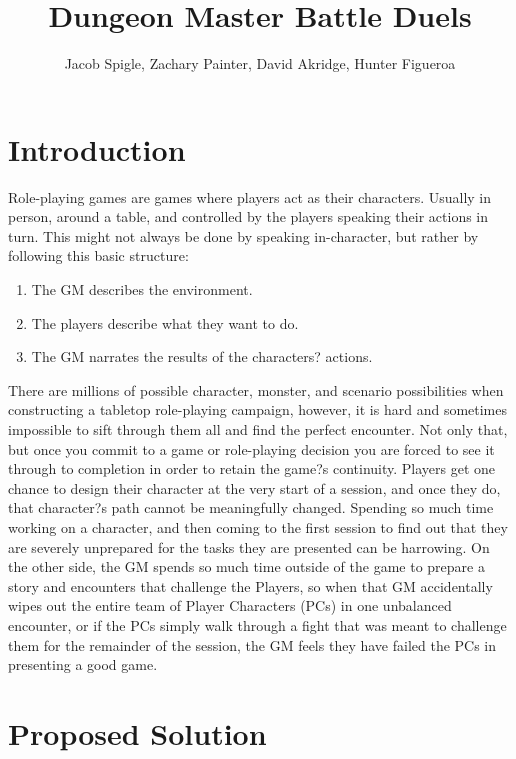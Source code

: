 \documentclass[12pt,a4paper]{report}
\author{Jacob Spigle, Zachary Painter, David Akridge, Hunter Figueroa}
\title{Dungeon Master Battle Duels}
\begin{document}
	
\maketitle

\tableofcontents
	
\newpage
\chapter*{Introduction}

Role-playing games are games where players act as their characters. Usually in person, around a table, and controlled by the players speaking their actions in turn. This might not always be done by speaking in-character, but rather by following this basic structure:

\begin{enumerate}
	\item The GM describes the environment.
	\item The players describe what they want to do.
	\item The GM narrates the results of the characters? actions.
\end{enumerate}

There are millions of possible character, monster, and scenario possibilities when constructing a tabletop role-playing campaign, however, it is hard and sometimes impossible to sift through them all and find the perfect encounter. Not only that,  but once you commit to a game or role-playing decision you are forced to see it through to completion in order to retain the game?s continuity. Players get one chance to design their character at the very start of a session, and once they do, that character?s path cannot be meaningfully changed. Spending so much time working on a character, and then coming to the first session to find out that they are severely unprepared for the tasks they are presented can be harrowing. On the other side, the GM spends so much time outside of the game to prepare a story and encounters that challenge the Players, so when that GM accidentally wipes out the entire team of Player Characters (PCs) in one unbalanced encounter, or if the PCs simply walk through a fight that was meant to challenge them for the remainder of the session, the GM feels they have failed the PCs in presenting a good game.

\newpage
\chapter*{Proposed Solution}
\end{document}
